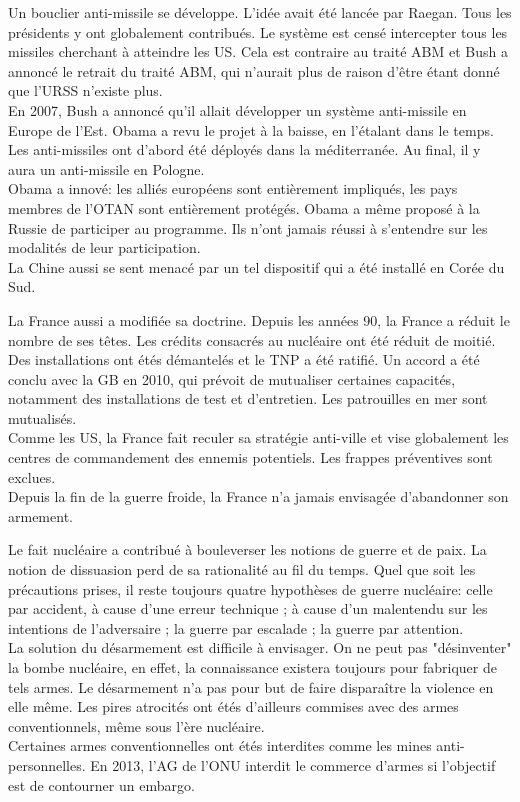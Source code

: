 \documentclass[10pt, a4paper, openany]{book}
\begin{document}
Un bouclier anti-missile se développe. L'idée avait été lancée par Raegan. Tous les présidents y ont globalement contribués. Le système est censé intercepter tous les missiles cherchant à atteindre les US. Cela est contraire au traité ABM et Bush a annoncé le retrait du traité ABM, qui n'aurait plus de raison d'être étant donné que l'URSS n'existe plus. \\
En 2007, Bush a annoncé qu'il allait développer un système anti-missile en Europe de l'Est. Obama a revu le projet à la baisse, en l'étalant dans le temps. Les anti-missiles ont d'abord été déployés dans la méditerranée. Au final, il y aura un anti-missile en Pologne. \\
Obama a innové: les alliés européens sont entièrement impliqués, les pays membres de l'OTAN sont entièrement protégés. Obama a même proposé à la Russie de participer au programme. Ils n'ont jamais réussi à s'entendre sur les modalités de leur participation. \\
La Chine aussi se sent menacé par un tel dispositif qui a été installé en Corée du Sud. 


La France aussi a modifiée sa doctrine. Depuis les années 90, la France a réduit le nombre de ses têtes. Les crédits consacrés au nucléaire ont été réduit de moitié. Des installations ont étés démantelés et le TNP a été ratifié. Un accord a été conclu avec la GB en 2010, qui prévoit de mutualiser certaines capacités, notamment des installations de test et d'entretien. Les patrouilles en mer sont mutualisés. \\
Comme les US, la France fait reculer sa stratégie anti-ville et vise globalement les centres de commandement des ennemis potentiels. Les frappes préventives sont exclues. \\
Depuis la fin de la guerre froide, la France n'a jamais envisagée d'abandonner son armement. 


Le fait nucléaire a contribué à bouleverser les notions de guerre et de paix. La notion de dissuasion perd de sa rationalité au fil du temps. Quel que soit les précautions prises, il reste toujours quatre hypothèses de guerre nucléaire: celle par accident, à cause d'une erreur technique ; à cause d'un malentendu sur les intentions de l'adversaire ; la guerre par escalade ; la guerre par attention. \\
La solution du désarmement est difficile à envisager. On ne peut pas "désinventer" la bombe nucléaire, en effet, la connaissance existera toujours pour fabriquer de tels armes. Le désarmement n'a pas pour but de faire disparaître la violence en elle même. Les pires atrocités ont étés d'ailleurs commises avec des armes conventionnels, même sous l'ère nucléaire. \\
Certaines armes conventionnelles ont étés interdites comme les mines anti-personnelles. En 2013, l'AG de l'ONU interdit le commerce d'armes si l'objectif est de contourner un embargo. 
\end{document}
